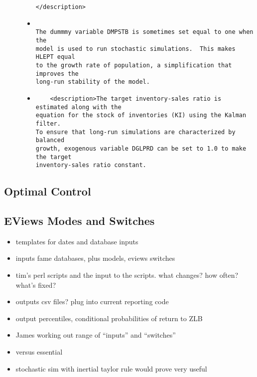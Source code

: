 \documentclass[12pt]{article}
\begin{document}
\begin{description}
\begin{itemize}
\begin{verbatim}
</description>

\end{verbatim}
  \item 
\begin{verbatim}

The dummmy variable DMPSTB is sometimes set equal to one when the
model is used to run stochastic simulations.  This makes HLEPT equal
to the growth rate of population, a simplification that improves the
long-run stability of the model.

\end{verbatim}
  \item 
\begin{verbatim}
    <description>The target inventory-sales ratio is estimated along with the
equation for the stock of inventories (KI) using the Kalman filter.
To ensure that long-run simulations are characterized by balanced
growth, exogenous variable DGLPRD can be set to 1.0 to make the target
inventory-sales ratio constant.

\end{verbatim}
  \end{itemize}
\end{description}


\subsection{Optimal Control}
\label{sec:optimalcontrol}

\subsection{EViews Modes and Switches}

\label{sec:eviews}
\begin{itemize}
\item templates for dates and database inputs
\item inputs fame databases, plus models, eviews switches
\item tim's perl scripts and the input to the scripts.  what changes? how often? what's fixed?
\item outputs csv files?  plug into current reporting code
\item output percentiles, conditional probabilities of return to ZLB
\item James working out range of ``inputs'' and ``switches'' 
\item  versus essential
\item stochastic sim with inertial taylor rule would prove very useful
\end{itemize}
\end{document}

